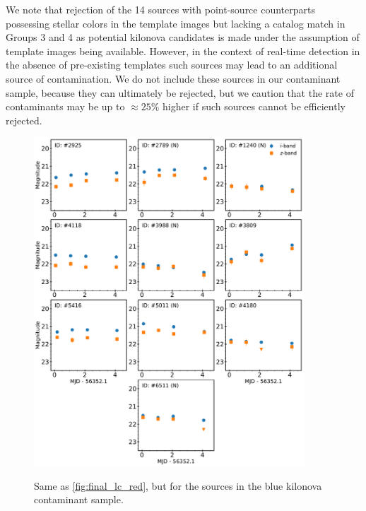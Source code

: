 We note that rejection of the 14 sources with point-source counterparts possessing stellar colors in the template images but lacking a catalog match in Groups 3 and 4 as potential kilonova candidates is made under the assumption of template images being available. However, in the context of real-time detection in the absence of pre-existing templates such sources may lead to an additional source of contamination. We do not include these sources in our contaminant sample, because they can ultimately be rejected, but we caution that the rate of contaminants may be up to $\approx 25\%$ higher if such sources cannot be efficiently rejected.

\begin{figure}[!t]
\begin{center}
\hspace*{-0.1in} 
\scalebox{1.}
{\includegraphics[width=0.9\textwidth]{./figs/chapter3/f5.pdf}} 
\caption{Same as \autoref{fig:final_lc_red}, but for the sources in the blue kilonova contaminant sample.}
\label{fig:final_lc_blue}
\end{center}
\vspace{1.1cm}
\end{figure}

